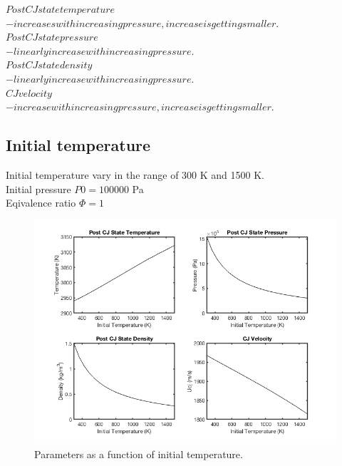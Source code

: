 \documentclass[a4paper]{article}
\newcommand{\sepspace}{\vspace*{1em}}
\begin{document}
\sepspace

\noindent
\circ $ Post CJ state temperature$\\ 
\indent $- increases with increasing pressure, increase is getting smaller.$\\
\circ $ Post CJ state pressure$\\
\indent $-linearly increase with increasing pressure.$\\
\circ $ Post CJ state density$\\
\indent $- linearly increase with increasing pressure.$\\
\circ $ CJ velocity$\\
\indent $- increase with increasing pressure, increase is getting smaller.$\\



\pagebreak

\subsection{Initial temperature}
\sepspace


Initial temperature vary in the range of 300 K and 1500 K.\\
Initial pressure $P0 = 100 000$ Pa\\
Eqivalence ratio $\Phi = 1$

\begin{figure}[h!]
\centering
\includegraphics[width=1\textwidth]{T.png}
\caption{\label{fig:1}Parameters as a function of initial temperature.}
\end{figure}
\end{document}
